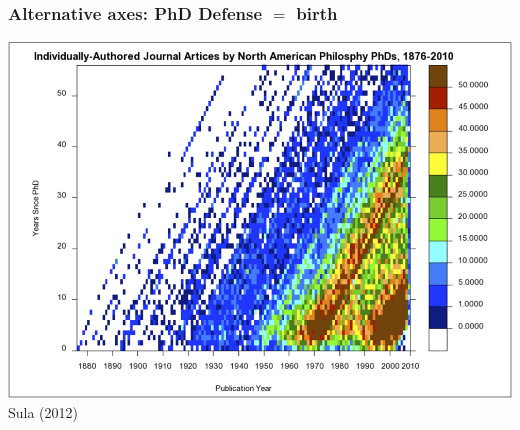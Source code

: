 \documentclass[20pt]{beamer}
\begin{document}
\begin{frame}
\frametitle{Alternative axes: PhD Defense $=$ birth}
\includegraphics[scale=1.3]{Figures/LexisArticles.png}\\
Sula (2012)
\end{frame}


%
%
%
\end{document}
